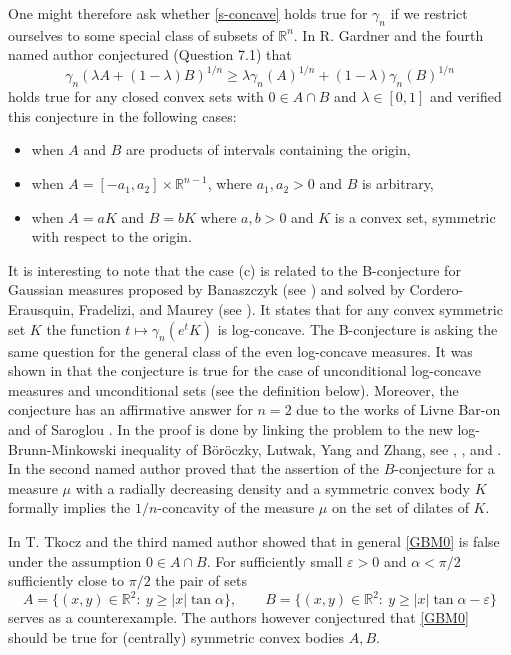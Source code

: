 \documentclass[11pt]{article}
\newcommand{\mb}[1]{\mathbb{{#1}}}
\newcommand{\1}{\mathbf{{1}}}
\newcommand{\e}{\varepsilon}
\theoremstyle{definition}
\begin{document}
One might therefore ask whether \eqref{s-concave} holds true for $\gamma_n$ if we restrict ourselves  to some special class of subsets of $\mb{R}^n$. In \cite{GZ} R. Gardner and the fourth named author conjectured (Question 7.1) that
\begin{equation}\label{GBM0}
	\gamma_n(\lambda A + (1-\lambda)B)^{1/n} \geq \lambda \gamma_n(A)^{1/n} + (1-\lambda) \gamma_n(B)^{1/n}
\end{equation}
holds true for any closed convex sets with $0 \in A \cap B$ and $\lambda \in [0,1]$ and verified this conjecture in the following cases:
\begin{itemize}
\item[(a)] when $A$ and $B$ are products of intervals containing the origin,
\item[(b)] when $A=[-a_1,a_2] \times \mb{R}^{n-1}$, where $a_1,a_2>0$ and $B$ is arbitrary,
\item[(c)] when $A = aK$ and $B = bK$ where $a, b > 0$ and $K$ is a convex set, symmetric with respect to the origin.
\end{itemize}
It is interesting to note that the  case (c) is related to the B-conjecture for Gaussian measures proposed by Banaszczyk (see \cite{L2}) and solved by Cordero-Erausquin,  Fradelizi, and Maurey (see \cite{CFM}). It states that for any convex symmetric set $K$ the function $t \mapsto \gamma_n(e^t K)$ is log-concave. The B-conjecture is asking the same question for the general class of the even  log-concave measures. It was shown in \cite{CFM} that the conjecture  is true for the case of  unconditional log-concave measures and unconditional sets (see the definition below). Moreover, the conjecture has an affirmative answer for $n = 2$ due to the works of Livne Bar-on \cite{Li} and of Saroglou \cite{S2}. In \cite{S2} the proof is done by linking the problem to the new log-Brunn-Minkowski inequality of B\"or\"oczky,  Lutwak,  Yang and  Zhang, see \cite{BLYZ1}, \cite{BLYZ2}, \cite{S1} and \cite{S2}.  In \cite{M2} the second named author proved that the assertion of the $B$-conjecture for a measure $\mu$ with a radially decreasing density and a symmetric convex body $K$ formally implies the $1/n$-concavity of the measure $\mu$ on the set of dilates of $K$.


In \cite{NT} T. Tkocz and the third named author showed that in general \eqref{GBM0} is false under the assumption $0 \in A \cap B$. For sufficiently small $\e>0$ and $\alpha < \pi/2$ sufficiently close to $\pi/2$ the pair of sets
\[
	A=\{(x,y) \in \mb{R}^2: \ y \geq |x| \tan \alpha\}, \qquad B=\{(x,y) \in \mb{R}^2: \ y \geq |x| \tan \alpha-\e\}
\]
serves as a counterexample. The authors however conjectured that \eqref{GBM0} should be true for (centrally) symmetric convex bodies $A,B$.
\end{document}
